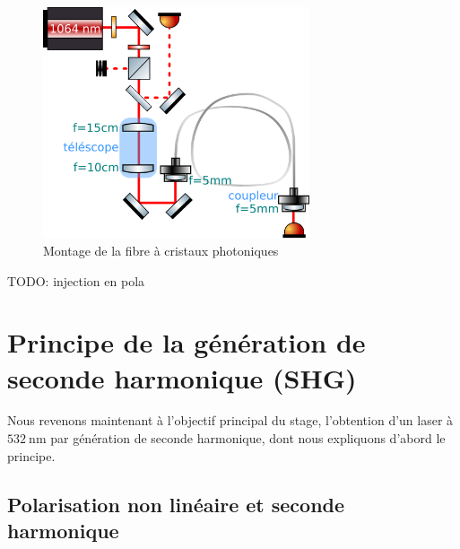 \documentclass[11pt,a4paper] { article}
\newcommand{\lmbd}[1]{$\SI{#1}{\nano\metre}$}
\begin{document}
\begin{figure}[h]
	\centering
	\includegraphics[width=0.7\textwidth]{./img/schema couplage.png}
	\caption{Montage de la fibre à cristaux photoniques}
	\label{fig:couplage}
\end{figure}

TODO: injection en pola


\section{Principe de la génération de seconde harmonique (SHG)} %
\label{SHG}

Nous revenons maintenant à l'objectif principal du stage, l'obtention d'un laser à \lmbd{532} par génération de seconde harmonique, dont nous expliquons d'abord le principe.

\subsection{Polarisation non linéaire et seconde harmonique}
\end{document}
